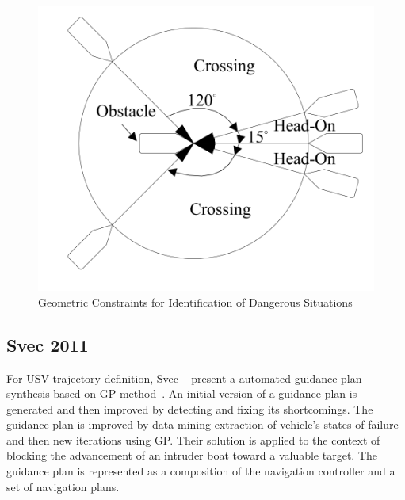     \begin{figure}[H]
        \centering
        \includegraphics[scale=0.4]{figs/Zhuang2011Motion_Sectors.png}
        \caption{Geometric Constraints for Identification of Dangerous Situations \cite{Zhuang2011Motion}}
        \label{fig:Zhuang2011Motion_Sectors}
    \end{figure}
    
    \subsection{Svec 2011}
    For \ac{USV} trajectory definition, Svec \etal~\cite{Svec2011aAutomated, Svec2012Automated} present a automated guidance plan synthesis based on \ac{GP} method~\cite{Russel2003AI_GA}.
    An initial version of a guidance plan is generated and then improved by detecting and fixing its shortcomings. The guidance plan is improved by data mining extraction of vehicle's states of failure and then new iterations using \ac{GP}. Their solution is applied to the context of blocking the advancement of an intruder boat toward a valuable target. The guidance plan is represented as a composition of the navigation controller and a set of navigation plans.
    
